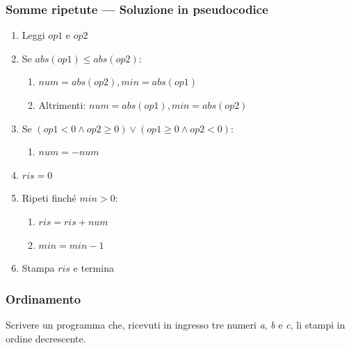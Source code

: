 \documentclass[aspectratio=169,]{beamer}
\begin{document}
\begin{frame}
\frametitle{Somme ripetute --- Soluzione in pseudocodice}
\begin{enumerate}
	\item Leggi $op1$ e $op2$
	\item Se $abs(op1) \leq abs(op2)$:
	\begin{enumerate}
		\item $num=abs(op2), min=abs(op1)$
		\item Altrimenti: $num=abs(op1), min=abs(op2)$
	\end{enumerate}

	\item Se $(op1 < 0 \wedge op2 \geq 0) \vee (op1 \geq 0 \wedge op2 < 0)$:
	\begin{enumerate}%
		\item $num = -num$
	\end{enumerate}

	\item $ris = 0$
	\item Ripeti finché $min > 0$:
	\begin{enumerate}
		\item $ris = ris + num$
		\item $min = min - 1$
	\end{enumerate}
	\item Stampa $ris$ e termina
\end{enumerate}
\end{frame}

\iffalse
\begin{frame}
\frametitle{Ordinamento}
Scrivere un programma che, ricevuti in ingresso tre numeri \emph{a}, \emph{b} e \emph{c}, li stampi in ordine decrescente.
\end{frame}
\end{document}
